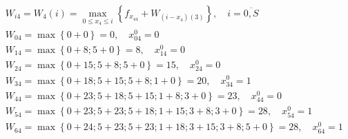 \begin{align*}
     & W_{i4} = W_4(i) = \max\limits_{0 \leq x_4 \leq i} \left\{ f_{x_44} + W_{(i-x_4)(3)} \right\}, \quad i = \overline{0, S} \\
     & W_{04} = \max \left\{0 + 0\right\} = 0, \quad x_{04}^0 = 0                                                              \\
     & W_{14} = \max \left\{0 + 8; 5 + 0\right\} = 8, \quad x_{14}^0 = 0                                                       \\
     & W_{24} = \max \left\{0 + 15; 5 + 8; 5 + 0\right\} = 15, \quad x_{24}^0 = 0                                              \\
     & W_{34} = \max \left\{0 + 18; 5 + 15; 5 + 8; 1 + 0\right\} = 20, \quad x_{34}^0 = 1                                      \\
     & W_{44} = \max \left\{0 + 23; 5 + 18; 5 + 15; 1 + 8; 3 + 0\right\} = 23, \quad x_{44}^0 = 0                              \\
     & W_{54} = \max \left\{0 + 23; 5 + 23; 5 + 18; 1 + 15; 3 + 8; 3 + 0\right\} = 28, \quad x_{54}^0 = 1                      \\
     & W_{64} = \max \left\{0 + 24; 5 + 23; 5 + 23; 1 + 18; 3 + 15; 3 + 8; 5 + 0\right\} = 28, \quad x_{64}^0 = 1
\end{align*}

